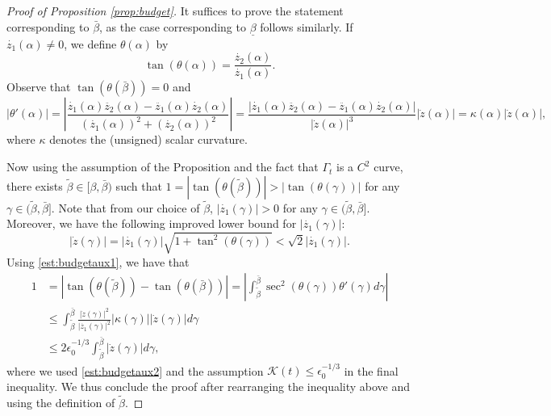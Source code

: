 \documentclass[11pt]{article}
\numberwithin{equation}{section}
\newcommand{\eps}{\epsilon}
\newcommand{\calK}{\mathcal{K}}
\begin{document}
\begin{proof}[Proof of Proposition \ref{prop:budget}]
It suffices to prove the statement corresponding to $\bar{\beta}$, as the case corresponding to $\underline{\beta}$ follows similarly. If $\dot{z_1}(\alpha) \neq 0$, we define $\theta(\alpha)$ by
$$
\tan(\theta(\alpha)) = \frac{\dot{z_2}(\alpha)}{\dot{z_1}(\alpha)}.
$$
Observe that $\tan(\theta(\bar\beta)) = 0$ and
\begin{equation}\label{est:budgetaux1}
|\theta'(\alpha)| = \left|\frac{\dot{z_1}(\alpha)\ddot{z_2}(\alpha) - \ddot{z_1}(\alpha)\dot{z_2}(\alpha)}{(\dot{z_1}(\alpha))^2 + (\dot{z_2}(\alpha))^2}\right| = \frac{\left|\dot{z_1}(\alpha)\ddot{z_2}(\alpha) - \ddot{z_1}(\alpha)\dot{z_2}(\alpha)\right|}{|\dot{z}(\alpha)|^3}|\dot{z}(\alpha)| = \kappa(\alpha)|\dot{z}(\alpha)|,
\end{equation}
where $\kappa$ denotes the (unsigned) scalar curvature.

Now using the assumption of the Proposition and the fact that $\Gamma_t$ is a $C^2$ curve, there exists $\tilde{\beta} \in [\beta, \bar{\beta})$ such that $1 = |\tan(\theta(\tilde\beta))| > |\tan(\theta(\gamma))|$ for any $\gamma \in (\tilde\beta, \bar{\beta}]$. Note that from our choice of $\tilde\beta$, $|\dot{z_1}(\gamma)| > 0$ for any $\gamma \in (\tilde\beta, \bar{\beta}]$. Moreover, we have the following improved lower bound for $|\dot{z_1}(\gamma)|$:
\begin{equation}\label{est:budgetaux2}
|\dot{z}(\gamma)| = |\dot{z_1}(\gamma)|\sqrt{1 + \tan^2(\theta(\gamma))} < \sqrt{2}|\dot{z_1}(\gamma)|.
\end{equation}
Using \eqref{est:budgetaux1}, we have that
\begin{align*}
    1 &= \left|\tan(\theta(\tilde\beta)) - \tan(\theta(\bar\beta))\right| = \left|\int_{\tilde\beta}^{\bar\beta} \sec^2(\theta(\gamma))\theta'(\gamma) d\gamma\right|\\
    &\le \int_{\tilde\beta}^{\bar\beta} \frac{|\dot{z}(\gamma)|^2}{|\dot{z_1}(\gamma)|^2}|\kappa(\gamma)||\dot{z}(\gamma)|d\gamma\\
    &\le 2\eps_0^{-1/3}\int_{\tilde\beta}^{\bar\beta}|\dot{z}(\gamma)|d\gamma,
\end{align*}
where we used \eqref{est:budgetaux2} and the assumption $\calK(t) \le \eps_0^{-1/3}$ in the final inequality. We thus conclude the proof after rearranging the inequality above and using the definition of $\tilde\beta$.
\end{proof}
\end{document}

